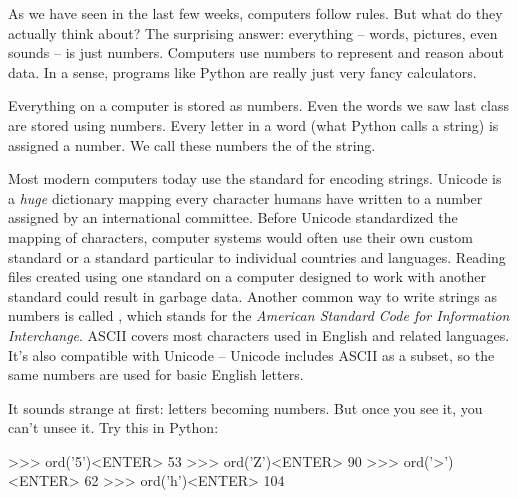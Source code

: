 
As we have seen in the last few weeks, computers follow rules. But what do they actually think
about?  The surprising answer: everything -- words, pictures, even sounds -- is just
numbers. Computers use numbers to represent and reason about data.   In a sense, programs like Python are really just very fancy calculators.

Everything on a computer is stored as numbers. Even the words we saw last class are stored using
numbers. Every letter in a word (what Python calls a string) is assigned a number. We call these
numbers the  of the string.

Most modern computers today use the  standard for encoding strings. Unicode is a
\emph{huge} dictionary mapping every character humans have written to a number assigned by an
international committee. Before Unicode standardized the mapping of characters, computer systems would often use
their own custom standard or a standard particular to individual countries and languages. Reading
files created using one standard on a computer designed to work with another standard could result
in garbage data. Another common way to write strings as numbers is called , which stands
for the \emph{American Standard Code for Information Interchange}. ASCII covers most characters used
in English and related languages. It's also compatible with Unicode -- Unicode includes ASCII as a
subset, so the same numbers are used for basic English letters.

It sounds strange at first: letters becoming numbers. But once you see it, you can't unsee it. Try
this in Python:

\tikzbackground{
}
\begin{replbox}
>>> ord('5')<ENTER>
53
>>> ord('Z')<ENTER>
90
>>> ord('>')<ENTER>
62
>>> ord('h')<ENTER>
104
\end{replbox}

